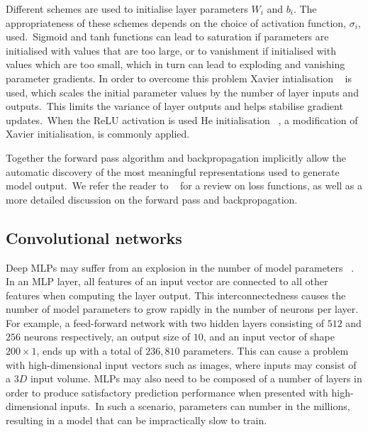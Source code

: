 \noindent Different schemes are used to initialise layer parameters $ W_i $ and $ b_i $. The appropriateness of these schemes depends on the choice of activation function, $ \sigma_i $, used.\ Sigmoid and tanh functions can lead to saturation if parameters are initialised with values that are too large, or to vanishment if initialised with values which are too small, which in turn can lead to exploding and vanishing parameter gradients. In order to overcome this problem Xavier intialisation \unskip ~\citep{glorot2010understanding} is used, which scales the initial parameter values by the number of layer inputs and outputs.\ This limits the variance of layer outputs and helps stabilise gradient updates.\ When the ReLU activation is used He initialisation \unskip ~\citep{he2015delving}, a modification of Xavier initialisation, is commonly applied. \par

\noindent Together the forward pass algorithm and backpropagation implicitly allow the automatic discovery of the most meaningful representations used to generate model output.\ We refer the reader to \unskip ~\citep{Goodfellow-et-al-2016} for a review on loss functions, as well as a more detailed discussion on the forward pass and backpropagation. 



\subsection{Convolutional networks}

Deep MLPs may suffer from an explosion in the number of model parameters \unskip ~\citep{krizhevsky2012imagenet}. In an MLP layer, all features of an input vector are connected to all other features when computing the layer output. This interconnectedness causes the number of model parameters to grow rapidly in the number of neurons per layer. For example, a feed-forward network with two hidden layers consisting of $ 512 $ and $ 256 $ neurons respectively, an output size of $10$, and an input vector of shape $ 200 \times 1 $, ends up with a total of $ 236,810 $ parameters. This can cause a problem with high-dimensional input vectors such as images, where inputs may consist of a $ 3D $ input volume. MLPs may also need to be composed of a number of layers in order to produce satisfactory prediction performance when presented with high-dimensional inputs.\ In such a scenario, parameters can number in the millions, resulting in a model that can be impractically slow to train. \par

